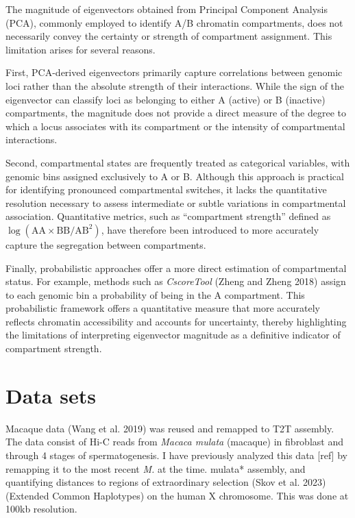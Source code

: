 \documentclass[
  10pt,
  a4paper,
  openany]{scrbook}
\begin{document}
The magnitude of eigenvectors obtained from Principal Component Analysis
(PCA), commonly employed to identify A/B chromatin compartments, does
not necessarily convey the certainty or strength of compartment
assignment. This limitation arises for several reasons.

First, PCA-derived eigenvectors primarily capture correlations between
genomic loci rather than the absolute strength of their interactions.
While the sign of the eigenvector can classify loci as belonging to
either A (active) or B (inactive) compartments, the magnitude does not
provide a direct measure of the degree to which a locus associates with
its compartment or the intensity of compartmental interactions.

Second, compartmental states are frequently treated as categorical
variables, with genomic bins assigned exclusively to A or B. Although
this approach is practical for identifying pronounced compartmental
switches, it lacks the quantitative resolution necessary to assess
intermediate or subtle variations in compartmental association.
Quantitative metrics, such as ``compartment strength'' defined as
\(\log(\text{AA} \times \text{BB}/\text{AB}^2)\), have therefore been
introduced to more accurately capture the segregation between
compartments.

Finally, probabilistic approaches offer a more direct estimation of
compartmental status. For example, methods such as \emph{CscoreTool}
(Zheng and Zheng 2018) assign to each genomic bin a probability of being
in the A compartment. This probabilistic framework offers a quantitative
measure that more accurately reflects chromatin accessibility and
accounts for uncertainty, thereby highlighting the limitations of
interpreting eigenvector magnitude as a definitive indicator of
compartment strength.

\section{Data sets}\label{data-sets}

Macaque data (Wang et al. 2019) was reused and remapped to T2T assembly.
The data consist of Hi-C reads from \emph{Macaca mulata} (macaque) in
fibroblast and through 4 stages of spermatogenesis. I have previously
analyzed this data {[}ref{]} by remapping it to the most recent
\emph{M.} at the time. mulata* assembly, and quantifying distances to
regions of extraordinary selection (Skov et al. 2023) (Extended Common
Haplotypes) on the human X chromosome. This was done at 100kb
resolution.
\end{document}
